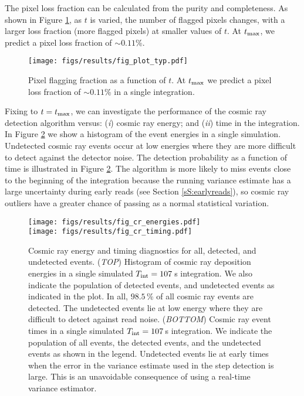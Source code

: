 \documentclass{ws-jai}
\begin{document}
The pixel loss fraction can be calculated from the purity and
completeness.  As shown in Figure \ref{fig:typ}, as $t$ is varied, the
number of flagged pixels changes, with a larger loss fraction (more
flagged pixels) at smaller values of $t$.  At $t_{\rm max}$, we
predict a pixel loss fraction of $\sim 0.11$\%.

\begin{figure*}[ht!]
\centering
\texttt{[image: figs/results/fig\_plot\_typ.pdf]}
\caption{Pixel flagging fraction as a function of $t$.  At
  $t_{\rm max}$ we predict a pixel loss fraction of $\sim 0.11$\% in a
  single integration.  \label{fig:typ} }
\end{figure*}

Fixing to $t=t_{\rm max}$, we can investigate the performance of the
cosmic ray detection algorithm versus: (\textit{i}) cosmic ray energy;
and (\textit{ii}) time in the integration.  In Figure \ref{fig:fc1} we
show a histogram of the event energies in a single simulation.
Undetected cosmic ray events occur at low energies where they are more
difficult to detect against the detector noise.  The detection
probability as a function of time is illustrated in Figure
\ref{fig:fc1}.  The algorithm is more likely to miss events close to
the beginning of the integration because the running variance estimate
has a large uncertainty during early reads (see Section
\ref{sS:earlyreads}), so cosmic ray outliers have a greater chance of
passing as a normal statistical variation.

\begin{figure*}[ht!]
\centering
\texttt{[image: figs/results/fig\_cr\_energies.pdf]} \\
\texttt{[image: figs/results/fig\_cr\_timing.pdf]} 
\caption{Cosmic ray energy and timing diagnostics for all, detected,
  and undetected events.  (\textit{TOP}) Histogram of cosmic ray
  deposition energies in a single simulated $T_{\rm int} = 107 \,$s
  integration.  We also indicate the population of detected events,
  and undetected events as indicated in the plot.  In all, $98.5 \,$\%
  of all cosmic ray events are detected.  The undetected events lie at
  low energy where they are difficult to detect against read noise.
  (\textit{BOTTOM}) Cosmic ray event times in a single simulated
  $T_{\rm int} = 107 \,$s integration.  We indicate the population of
  all events, the detected events, and the undetected events as shown
  in the legend.  Undetected events lie at early times when the error
  in the variance estimate used in the step detection is large.  This
  is an unavoidable consequence of using a real-time variance
  estimator.\label{fig:fc1} }
\end{figure*}
\end{document}
